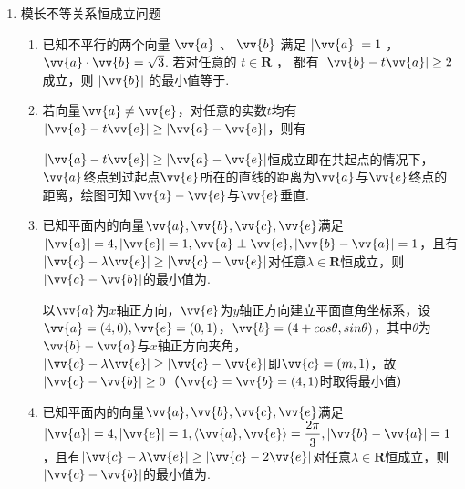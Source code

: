 \begin{enumerate}
\begin{enumerate}
        \end{enumerate}
    \item 模长不等关系恒成立问题
    \begin{enumerate}
        \item 已知不平行的两个向量 $\vv{a}$ 、 $\vv{b}$ 满足 $\left| \vv{a}\right|  = 1$ ， $\vv{a} \cdot  \vv{b} = \sqrt{3}$. 若对任意的 $t \in  \mathbf{R}$ ， 都有 $\left| {\vv{b} - t\vv{a}}\right|  \geq  2$ 成立，则 $\left| \vv{b}\right|$ 的最小值等于.
        \item 若向量$\vv{a} \neq \vv{e}$，对任意的实数$t$均有$|\vv{a}-t\vv{e}| \geq |\vv{a} - \vv{e}|$，则有
        \begin{jieda}
            $|\vv{a}-t\vv{e}| \geq |\vv{a} - \vv{e}|$恒成立即在共起点的情况下，$\vv{a}$终点到过起点$\vv{e}$所在的直线的距离为$\vv{a}$与$\vv{e}$终点的距离，绘图可知$\vv{a} - \vv{e}$与$\vv{e}$垂直.
        \end{jieda}
        \item 已知平面内的向量$\vv{a}, \vv{b}, \vv{c}, \vv{e}$满足$|\vv{a}| = 4, |\vv{e}| = 1, \vv{a} \perp \vv{e}, |\vv{b} - \vv{a}| = 1$，且有$|\vv{c} - \lambda \vv{e}| \geq |\vv{c} - \vv{e}|$对任意$\lambda \in \mathbf{R}$恒成立，则$|\vv{c} - \vv{b}|$的最小值为.
        \begin{jieda}
            以$\vv{a}$为$x$轴正方向，$\vv{e}$为$y$轴正方向建立平面直角坐标系，设$\vv{a} = (4, 0), \vv{e} = (0, 1)$，$\vv{b} = (4+cos\theta, sin\theta)$，其中$\theta$为$\vv{b} - \vv{a}$与$x$轴正方向夹角，$|\vv{c} - \lambda \vv{e}| \geq |\vv{c} - \vv{e}|$即$\vv{c} = (m, 1)$，故$|\vv{c} - \vv{b}| \geq 0$（$\vv{c} = \vv{b} = (4, 1)$时取得最小值）
        \end{jieda}
        

        \item 已知平面内的向量$\vv{a}, \vv{b}, \vv{c}, \vv{e}$满足$|\vv{a}| = 4, |\vv{e}| = 1, \langle\vv{a}, \vv{e}\rangle = \dfrac{2\pi}{3}, |\vv{b} - \vv{a}| = 1$，且有$|\vv{c} - \lambda \vv{e}| \geq |\vv{c} - 2\vv{e}|$对任意$\lambda \in \mathbf{R}$恒成立，则$|\vv{c} - \vv{b}|$的最小值为.
        

\end{enumerate}
\end{enumerate}
